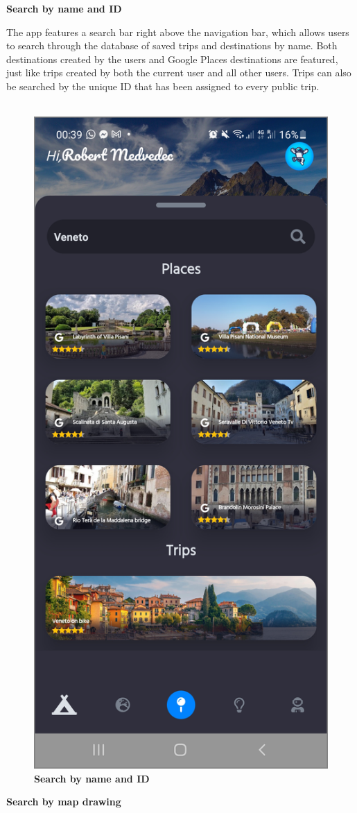 \textbf{Search by name and ID}

The app features a search bar right above the navigation bar, which allows users to search through the database of saved trips and destinations by name. Both destinations created by the users and Google Places destinations are featured, just like trips created by both the current user and all other users. Trips can also be searched by the unique ID that has been assigned to every public trip.\\ \\
\begin{figure}[!htb]
\centering
\includegraphics[width=.45\textwidth]{../Images/UI/SearchName.jpg}
\caption{\label{fig:dbapiuser}\textbf{Search by name and ID}}
\end{figure}
\newpage

\textbf{Search by map drawing}

